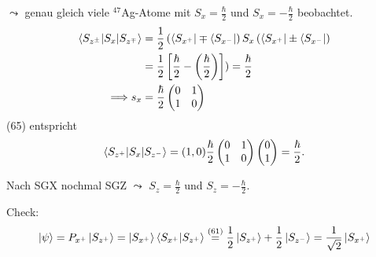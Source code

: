 \documentclass[a4paper]{scrartcl}
\begin{document}
{\begin{aaufz}
$\leadsto$ genau gleich viele $^{47}$Ag-Atome mit $S_x = \frac \hbar 2$ und $S_x = - \frac \hbar 2$ beobachtet.
\begin{align}
\braket{ S_{z^{\pm}} | S_x | S_{z^\mp}} & = \frac12 \left( \bra{ S_{x^+}} \mp \bra{ S_{x^-}} \right) S_x \left( \bra{ S_{x^+}} \pm \bra {S_{x^-}} \right) \notag \\
& = \frac12 \left[ \frac \hbar2 - \left( \frac \hbar2 \right) \right] ) = \frac \hbar 2 \\
\Longrightarrow s_x & = \frac \hbar 2 \begin{pmatrix} 0 & 1 \\ 1 & 0 \end{pmatrix} 
\end{align}
(65) entspricht
$$\braket{ S_{z^+} | S_x | S_{z^-}} = (1, 0) \frac\hbar2 \begin{pmatrix} 0 & 1 \\ 1 & 0 \end{pmatrix} \begin{pmatrix} 0 \\1 \end{pmatrix} = \frac \hbar 2.$$
\item Nach SGX nochmal SGZ $\leadsto$ $S_z = \frac\hbar2$ und $S_z = - \frac\hbar2$.

Check:
$$ \ket \psi = P_{x^+} \ket{ S_{z^+}} = \ket {S_{x^+}} \braket{ S_{x^+} | S_{z^+}} \stackrel{(61)}= \frac12 \ket{ S_{z^+}} + \frac12 \ket{ S_{z^-}} = \frac1{\sqrt 2} \ket{S_{x^+}}$$


\end{aaufz}}
\end{document}

